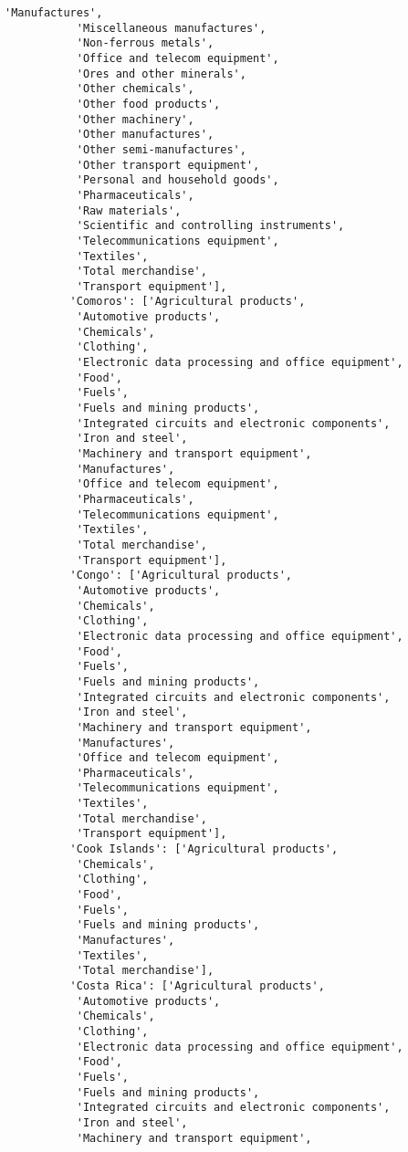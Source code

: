 \documentclass[11pt]{article}
\begin{document}
\begin{Verbatim}[commandchars=\\\{\}]
           'Manufactures',
           'Miscellaneous manufactures',
           'Non-ferrous metals',
           'Office and telecom equipment',
           'Ores and other minerals',
           'Other chemicals',
           'Other food products',
           'Other machinery',
           'Other manufactures',
           'Other semi-manufactures',
           'Other transport equipment',
           'Personal and household goods',
           'Pharmaceuticals',
           'Raw materials',
           'Scientific and controlling instruments',
           'Telecommunications equipment',
           'Textiles',
           'Total merchandise',
           'Transport equipment'],
          'Comoros': ['Agricultural products',
           'Automotive products',
           'Chemicals',
           'Clothing',
           'Electronic data processing and office equipment',
           'Food',
           'Fuels',
           'Fuels and mining products',
           'Integrated circuits and electronic components',
           'Iron and steel',
           'Machinery and transport equipment',
           'Manufactures',
           'Office and telecom equipment',
           'Pharmaceuticals',
           'Telecommunications equipment',
           'Textiles',
           'Total merchandise',
           'Transport equipment'],
          'Congo': ['Agricultural products',
           'Automotive products',
           'Chemicals',
           'Clothing',
           'Electronic data processing and office equipment',
           'Food',
           'Fuels',
           'Fuels and mining products',
           'Integrated circuits and electronic components',
           'Iron and steel',
           'Machinery and transport equipment',
           'Manufactures',
           'Office and telecom equipment',
           'Pharmaceuticals',
           'Telecommunications equipment',
           'Textiles',
           'Total merchandise',
           'Transport equipment'],
          'Cook Islands': ['Agricultural products',
           'Chemicals',
           'Clothing',
           'Food',
           'Fuels',
           'Fuels and mining products',
           'Manufactures',
           'Textiles',
           'Total merchandise'],
          'Costa Rica': ['Agricultural products',
           'Automotive products',
           'Chemicals',
           'Clothing',
           'Electronic data processing and office equipment',
           'Food',
           'Fuels',
           'Fuels and mining products',
           'Integrated circuits and electronic components',
           'Iron and steel',
           'Machinery and transport equipment',

\end{Verbatim}
\end{document}
